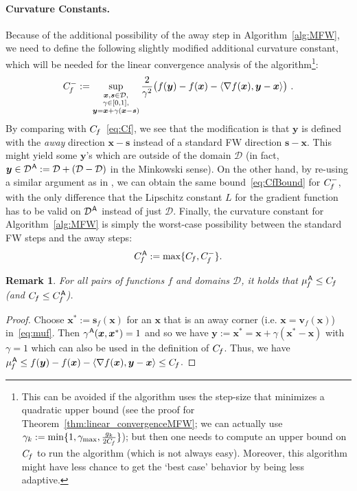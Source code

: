 \documentclass{article} %
\newtheorem{remark}[definition]{Remark}
\newcommand{\domain}{\mathcal{D}}
\newcommand{\stepsize}{\gamma}
\newcommand{\stepmax}{\stepsize_{\textrm{max}}} %
\newcommand{\away}{{\hspace{0.06em}\textsf{A}}}
\newcommand{\Cf}{C_{\hspace{-0.08em}f}}
\newcommand{\CfA}{C_{\hspace{-0.08em}f}^-}
\newcommand{\CfMFW}{C_{\hspace{-0.08em}f}^\away}
\newcommand{\strongConvMFW}{\mu_{\hspace{-0.08em}f}^\away}
\newcommand{\x}{\bm{x}}
\newcommand{\y}{\bm{y}}
\newcommand{\s}{\bm{s}}
\newcommand{\vv}{\bm{v}} %
\newcommand{\0}{\mathbf{0}} %
\begin{document}
\paragraph{Curvature Constants.}
Because of the additional possibility of the away step in Algorithm~\ref{alg:MFW}, we need to define the following slightly modified additional curvature constant, which will be needed for the linear convergence analysis of the algorithm\footnote{This can be avoided if the algorithm uses the step-size that minimizes a quadratic upper bound (see the proof for Theorem~\ref{thm:linear_convergenceMFW}; we can actually use $\stepsize_k := \min\{1,\stepmax, \frac{g_k}{2\Cf}\}$); but then one needs to compute an upper bound on $\Cf$ to run the algorithm (which is not always easy). Moreover, this algorithm might have less chance to get the `best case' behavior by being less adaptive.}:
\begin{equation}\label{eq:CfA}
  \CfA := \sup_{\substack{\x,\s\in \domain, \\
                      \stepsize\in[0,1],\\
                      \y = \x+\stepsize(\x-\s)}}
           \frac{2}{\stepsize^2}\big( f(\y)-f(\x)-\langle \nabla f(\x), \y-\x \rangle \big) \ .
\end{equation}
By comparing with $\Cf$~\eqref{eq:Cf}, we see that the modification is that $\y$ is defined with the \emph{away} direction $\x -\s$ instead of a standard FW direction $\s - \x$. This might yield some $\y$'s which are outside of the domain $\domain$ (in fact, $\y \in \domain^\away := \domain + (\domain - \domain)$ in the Minkowski sense). On the other hand, by re-using a similar argument as in \cite[Lemma 7]{Jaggi:2013wg}, we can obtain the same bound~\eqref{eq:CfBound} for $\CfA$, with the only difference that the Lipschitz constant $L$ for the gradient function has to be valid on $\domain^\away$ instead of just $\domain$.
Finally, the curvature constant for Algorithm~\ref{alg:MFW} is simply the worst-case possibility between the standard FW steps and the away steps:
\begin{equation}\label{eq:CfMFW}
  \CfMFW := \max\{\Cf, \CfA\}.
\end{equation}

%
\begin{remark}\label{rem:mfMFWsmallerThanCf}
For all pairs of functions $f$ and domains $\domain$, it holds that $\strongConvMFW \le \Cf$ (and $\Cf \le \CfMFW$).
\end{remark}\vspace{-2mm}
\begin{proof}
Choose $\x^* := \s_f(\x)$ for an $\x$ that is an away corner (i.e. $\x = \vv_f(\x)$) in~\eqref{eq:muf}. Then $\stepsize^\away(\x,\x^*) = 1$ and so we have $\y := \x^* = \x + \stepsize (\x^*-\x)$ with $\stepsize = 1$ which can also be used in the definition of $\Cf$. Thus, we have $\strongConvMFW \leq f(\y)-f(\x) - \langle \nabla f(\x), \y-\x \rangle \leq \Cf$.
\end{proof}
\end{document}
